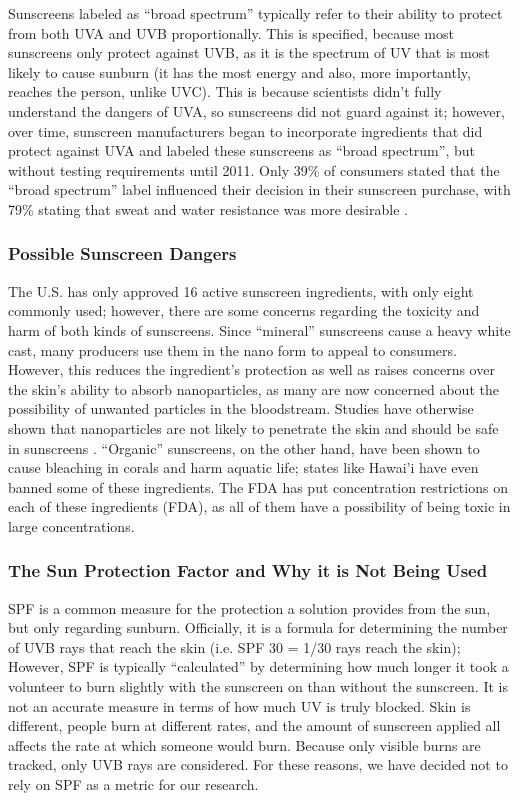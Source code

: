\documentclass{article}
\begin{document}
Sunscreens labeled as “broad spectrum” typically refer to their ability to protect from both UVA and UVB proportionally. This is specified, because most sunscreens only protect against UVB, as it is the spectrum of UV that is most likely to cause sunburn (it has the most energy and also, more importantly, reaches the person, unlike UVC). This is because scientists didn’t fully understand the dangers of UVA, so sunscreens did not guard against it; however, over time, sunscreen manufacturers began to incorporate ingredients that did protect against UVA and labeled these sunscreens as “broad spectrum”, but without testing requirements until 2011. Only 39\% of consumers stated that the “broad spectrum” label influenced their decision in their sunscreen purchase, with 79\% stating that sweat and water resistance was more desirable \cite{carribbean_sol_3_2022}.


\subsubsection{Possible Sunscreen Dangers}
The U.S. has only approved 16 active sunscreen ingredients, with only eight commonly used; however, there are some concerns regarding the toxicity and harm of both kinds of sunscreens. Since “mineral” sunscreens cause a heavy white cast, many producers use them in the nano form to appeal to consumers. However, this reduces the ingredient’s protection as well as raises concerns over the skin's ability to absorb nanoparticles, as many are now concerned about the possibility of unwanted particles in the bloodstream. Studies have otherwise shown that nanoparticles are not likely to penetrate the skin and should be safe in sunscreens \cite{mohammed_noninvasive_2020}. “Organic” sunscreens, on the other hand, have been shown to cause bleaching in corals and harm aquatic life; states like Hawai’i have even banned some of these ingredients. The FDA has put concentration restrictions on each of these ingredients (FDA), as all of them have a possibility of being toxic in large concentrations.

\subsubsection{The Sun Protection Factor and Why it is Not Being Used}
SPF is a common measure for the protection a solution provides from the sun, but only regarding sunburn. Officially, it is a formula for determining the number of UVB rays that reach the skin (i.e. SPF 30 = 1/30 rays reach the skin); However, SPF is typically “calculated” by determining how much longer it took a volunteer to burn slightly with the sunscreen on than without the sunscreen. It is not an accurate measure in terms of how much UV is truly blocked. Skin is different, people burn at different rates, and the amount of sunscreen applied all affects the rate at which someone would burn. Because only visible burns are tracked, only UVB rays are considered. For these reasons, we have decided not to rely on SPF as a metric for our research.
\end{document}
